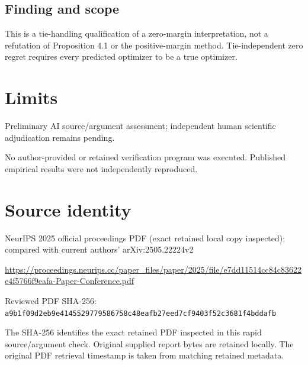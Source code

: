 \documentclass[11pt]{article}
\begin{document}
\subsection*{Finding and scope}

This is a tie-handling qualification of a zero-margin interpretation, not a refutation of Proposition 4.1 or the positive-margin method. Tie-independent zero regret requires every predicted optimizer to be a true optimizer.

\section*{Limits}

Preliminary AI source/argument assessment; independent human scientific adjudication remains pending.\par

No author-provided or retained verification program was executed. Published empirical results were not independently reproduced.\par

\section*{Source identity}

NeurIPS 2025 official proceedings PDF (exact retained local copy inspected); compared with current authors’ arXiv:2505.22224v2

\url{https://proceedings.neurips.cc/paper_files/paper/2025/file/e7dd11514cc84c83622e4f5766f9eafa-Paper-Conference.pdf}

Reviewed PDF SHA-256: \nolinkurl{a9b1f09d2eb9e4145529779586758c48eafb27eed7cf9403f52c3681f4bddafb}

The SHA-256 identifies the exact retained PDF inspected in this rapid source/argument check. Original supplied report bytes are retained locally. The original PDF retrieval timestamp is taken from matching retained metadata.
\end{document}
